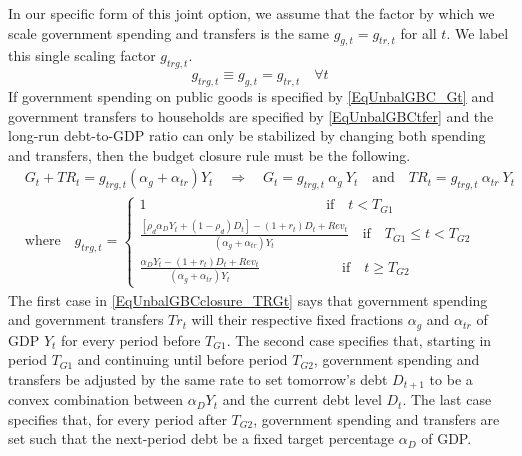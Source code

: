     In our specific form of this joint option, we assume that the factor by which we scale government spending and transfers is the same $g_{g,t} = g_{tr,t}$ for all $t$. We label this single scaling factor $g_{trg,t}$.
    \begin{equation}\label{EqUnbalGBCclosure_gTRGt}
      g_{trg,t}\equiv g_{g,t} = g_{tr,t} \quad\forall t
    \end{equation}
    If government spending on public goods is specified by \eqref{EqUnbalGBC_Gt} and government transfers to households are specified by \eqref{EqUnbalGBCtfer} and the long-run debt-to-GDP ratio can only be stabilized by changing both spending and transfers, then the budget closure rule must be the following.
    \begin{equation}\label{EqUnbalGBCclosure_TRGt}
      \begin{split}
        &G_t + TR_t = g_{trg,t}\left(\alpha_g + \alpha_{tr}\right)Y_t \quad\Rightarrow\quad G_t = g_{trg,t}\:\alpha_g\: Y_t \quad\text{and}\quad TR_t = g_{trg,t}\:\alpha_{tr}\:Y_t \\
        &\text{where}\quad g_{trg,t} =
          \begin{cases}
            1 \qquad\qquad\qquad\qquad\qquad\qquad\:\:\:\,\text{if}\quad t < T_{G1} \\
            \frac{\left[\rho_{d}\alpha_{D}Y_{t} + (1-\rho_{d})D_{t}\right] - (1+r_{t})D_{t} + Rev_{t}}{\left(\alpha_g + \alpha_{tr}\right)Y_t} \quad\text{if}\quad T_{G1}\leq t<T_{G2} \\
            \frac{\alpha_{D}Y_{t} - (1+r_{t})D_{t} + Rev_{t}}{\left(\alpha_g + \alpha_{tr}\right)Y_t} \qquad\qquad\quad\:\:\:\:\text{if}\quad t \geq T_{G2}
          \end{cases}
      \end{split}
    \end{equation}
    The first case in \eqref{EqUnbalGBCclosure_TRGt} says that government spending and government transfers $Tr_t$ will their respective fixed fractions $\alpha_g$ and $\alpha_{tr}$ of GDP $Y_t$ for every period before $T_{G1}$. The second case specifies that, starting in period $T_{G1}$ and continuing until before period $T_{G2}$, government spending and transfers be adjusted by the same rate to set tomorrow's debt $D_{t+1}$ to be a convex combination between $\alpha_D Y_t$ and the current debt level $D_t$. The last case specifies that, for every period after $T_{G2}$, government spending and transfers are set such that the next-period debt be a fixed target percentage $\alpha_D$ of GDP.

